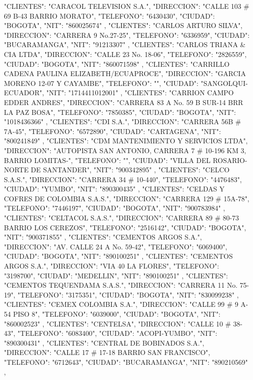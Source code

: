    {
   "CLIENTES": "CARACOL TELEVISION S.A.",
   "DIRECCION": "CALLE 103 # 69 B-43 BARRIO MORATO",
   "TELEFONO": "6430430",
   "CIUDAD": "BOGOTA",
   "NIT": "860025674"
   },
   {
   "CLIENTES": "CARLOS ARTURO SILVA",
   "DIRECCION": "CARRERA 9 No.27-25",
   "TELEFONO": "6336959",
   "CIUDAD": "BUCARAMANGA",
   "NIT": "91213307"
   },
   {
   "CLIENTES": "CARLOS TRIANA & CIA LTDA",
   "DIRECCION": "CALLE 23 No. 18-06",
   "TELEFONO": "2826559",
   "CIUDAD": "BOGOTA",
   "NIT": "860071598"
   },
   {
   "CLIENTES": "CARRILLO CADENA PAULINA ELIZABETH/ECUAPROCE",
   "DIRECCION": "GARCIA MORENO 12-07 Y CAYAMBE",
   "TELEFONO": "",
   "CIUDAD": "SANGOLQUI-ECUADOR",
   "NIT": "1714411012001"
   },
   {
   "CLIENTES": "CARRION CAMPO EDDER ANDRES",
   "DIRECCION": "CARRERA 83 A No. 59 B SUR-14 BRR LA PAZ BOSA",
   "TELEFONO": "7850385",
   "CIUDAD": "BOGOTA",
   "NIT": "1018436366"
   },
   {
   "CLIENTES": "CDI S.A.",
   "DIRECCION": "CARRERA 56B # 7A-45",
   "TELEFONO": "6572890",
   "CIUDAD": "CARTAGENA",
   "NIT": "800241849"
   },
   {
   "CLIENTES": "CDM MANTENIMIENTO Y SERVICIOS LTDA",
   "DIRECCION": "AUTOPISTA SAN ANTONIO, CARRERA 7 # 10-196 KM 3, BARRIO LOMITAS-",
   "TELEFONO": "",
   "CIUDAD": "VILLA DEL ROSARIO-NORTE DE SANTANDER",
   "NIT": "900342895"
   },
   {
   "CLIENTES": "CELCO S.A.S.",
   "DIRECCION": "CARRERA 34 # 10-440",
   "TELEFONO": "4476483",
   "CIUDAD": "YUMBO",
   "NIT": "890300435"
   },
   {
   "CLIENTES": "CELDAS Y COFRES DE COLOMBIA S.A.S.",
   "DIRECCION": "CARRERA 129 # 15A-78",
   "TELEFONO": "7446197",
   "CIUDAD": "BOGOTA",
   "NIT": "900783984"
   },
   {
   "CLIENTES": "CELTACOL S.A.S.",
   "DIRECCION": "CARRERA 89 # 80-73 BARRIO LOS CEREZOS",
   "TELEFONO": "2516142",
   "CIUDAD": "BOGOTA",
   "NIT": "900371855"
   },
   {
   "CLIENTES": "CEMENTOS ARGOS S.A.",
   "DIRECCION": "AV. CALLE 24 A No. 59-42",
   "TELEFONO": "6069400",
   "CIUDAD": "BOGOTA",
   "NIT": "890100251"
   },
   {
   "CLIENTES": "CEMENTOS ARGOS S.A.",
   "DIRECCION": "VIA 40 LA FLORES",
   "TELEFONO": "3198700",
   "CIUDAD": "MEDELLIN",
   "NIT": "890100251"
   },
   {
   "CLIENTES": "CEMENTOS TEQUENDAMA S.A.S.",
   "DIRECCION": "CARRERA 11 No. 75-19",
   "TELEFONO": "3175351",
   "CIUDAD": "BOGOTA",
   "NIT": "830099238"
   },
   {
   "CLIENTES": "CEMEX COLOMBIA S.A.",
   "DIRECCION": "CALLE 99 # 9 A-54 PISO 8",
   "TELEFONO": "6039000",
   "CIUDAD": "BOGOTA",
   "NIT": "860002523"
   },
   {
   "CLIENTES": "CENTELSA",
   "DIRECCION": "CALLE 10 # 38-43",
   "TELEFONO": "6083400",
   "CIUDAD": "ACOPI-YUMBO",
   "NIT": "890300431"
   },
   {
   "CLIENTES": "CENTRAL DE BOBINADOS S.A.",
   "DIRECCION": "CALLE 17 # 17-18 BARRIO SAN FRANCISCO",
   "TELEFONO": "6712643",
   "CIUDAD": "BUCARAMANGA",
   "NIT": "890210569"
   },
